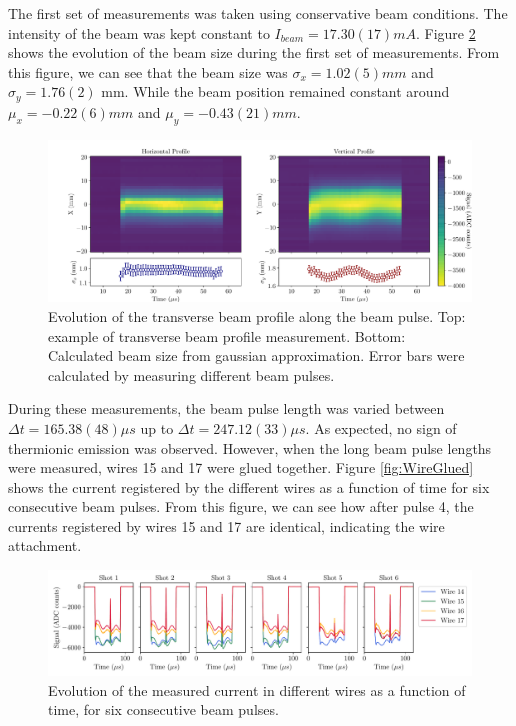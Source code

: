 The first set of measurements was taken using conservative beam conditions. The intensity of the beam was kept constant to $I_{beam} = 17.30 (17) mA$. Figure \ref{fig:PulseEvol} shows the evolution of the beam size during the first set of measurements. From this figure, we can see that the beam size was $\sigma_x = 1.02(5) mm$ and $\sigma_y = 1.76(2)$ mm. While the beam position remained constant around $\mu_x = -0.22(6) mm$ and $\mu_y = -0.43(21) mm$. 

\begin{figure}[h]
    \centering
    \includegraphics[width=1.0\columnwidth]{Figure_BeamProfileStudy/BeamProfEvol1.pdf}
    \caption{Evolution of the transverse beam profile along the beam pulse. Top: example of transverse beam profile measurement. Bottom: Calculated beam size from gaussian approximation. Error bars were calculated by measuring different beam pulses.  }
    \label{fig:PulseEvol}
\end{figure}

During these measurements, the beam pulse length was varied between $\Delta t = 165.38(48) \mu s$ up to $\Delta t = 247.12(33) \mu s$. As expected, no sign of thermionic emission was observed. However, when the long beam pulse lengths were measured, wires 15 and 17 were glued together. Figure \ref{fig:WireGlued} shows the current registered by the different wires as a function of time for six consecutive beam pulses. From this figure, we can see how after pulse 4, the currents registered by wires 15 and 17 are identical, indicating the wire attachment. 

\begin{figure}[h]
    \centering
    \includegraphics[width=1.0\columnwidth]{Figure_WiresGluing/WireWithTime.pdf}
    \caption{Evolution of the measured current in different wires as a function of time, for six consecutive beam pulses. }
    \label{fig:PulseEvol}
\end{figure}

